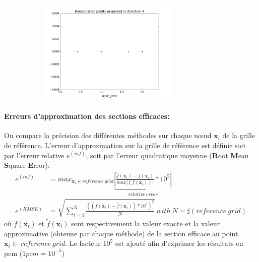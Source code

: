 \begin{center}
\begin{figure}[!h]
\begin{subfigure}[b]{0.3\textwidth}
				\includegraphics[width=\linewidth,height=5cm]{images/MOX/interpolation_points_4_macro_totale0.png}
		\end{subfigure}
\end{figure}
\label{figure:interppoints}
\end{center}


\paragraph{Erreurs d'approximation des sections efficaces:\\}
\hspace{0.5cm} On compare la précision des différentes méthodes sur chaque nœud $\textbf{x}_i$ de la grille de référence.
L'erreur d'approximation sur la grille de référence est définie soit par l'erreur relative $e^{(inf)}$,
soit par l'erreur quadratique moyenne (\textbf{R}oot \textbf{M}ean \textbf{S}quare \textbf{E}rror):
\begin{align}
		e^{(inf)} & = max_{\textbf{x}_i \in reference\ grid} \underbrace{ \left | \frac{\tilde{f}(\textbf{x}_i) - f(\textbf{x}_i)}{ max \left | \left \{ f(\textbf{x}_i) \right \} \right |} * 10^5 \right | }_{relative\ error}  \nonumber \\
		e^{(RMSE)} & = \sqrt{ \sum_{i=1}^N \frac{((f(\textbf{x}_i) - \tilde{f}(\textbf{x}_i)) * 10^5)^2}{N} }\ with\ N = \sharp(reference\ grid) \nonumber
\end{align}
où $f(\textbf{x}_i)$ et $\tilde{f}(\textbf{x}_i)$ sont respectivement la valeur exacte et la valeur approximative
(obtenue par chaque méthode) de la section efficace au point $\textbf{x}_i \in\ reference\ grid$. Le facteur $10^5$
est ajouté afin d'exprimer les résultats en pcm ($1pcm = 10^{-5}$)


